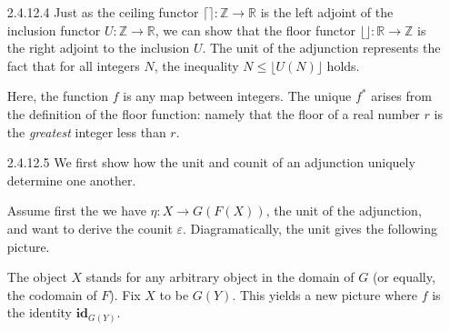 \documentclass{article}
\newcommand{\ccat}{\mathbf{C}}
\newcommand{\dcat}{\mathbf{D}}
\newcommand{\id}{\mathbf{id}}
\newcommand{\ints}{\mathbb{Z}}
\newcommand{\reals}{\mathbb{R}}
\newcommand{\ceil}[1]{\lceil #1 \rceil}
\newcommand{\floor}[1]{\lfloor #1 \rfloor}
\begin{document}
\begin{enumerate}
\vfill{}
\item[2.4.12.4]
  Just as the ceiling functor $\ceil{} : \ints \rightarrow \reals$ is the left adjoint of the inclusion functor $U : \ints \rightarrow \reals$, we can show that the floor functor $\floor{} : \reals \rightarrow \ints$ is the right adjoint to the inclusion $U$.
  The unit of the adjunction represents the fact that for all integers $N$, the inequality $N \le \floor{U(N)}$ holds.
  \begin{center}
  \end{center}
  Here, the function $f$ is any map between integers.
  The unique $f^*$ arises from the definition of the floor function: namely that the floor of a real number $r$ is the \emph{greatest} integer less than $r$.

\vfill{}
\newpage
\item[2.4.12.5]
  We first show how the unit and counit of an adjunction uniquely determine one another.

  Assume first the we have $\eta : X \rightarrow G(F(X))$, the unit of the adjunction, and want to derive the counit $\varepsilon$.
  Diagramatically, the unit gives the following picture.
  \begin{center}
  \end{center}
  The object $X$ stands for any arbitrary object in the domain of $G$ (or equally, the codomain of $F$).
  Fix $X$ to be $G(Y)$.
  This yields a new picture where $f$ is the identity $\id_{G(Y)}$.
  \begin{center}
\end{center}
\end{enumerate}
\end{document}
